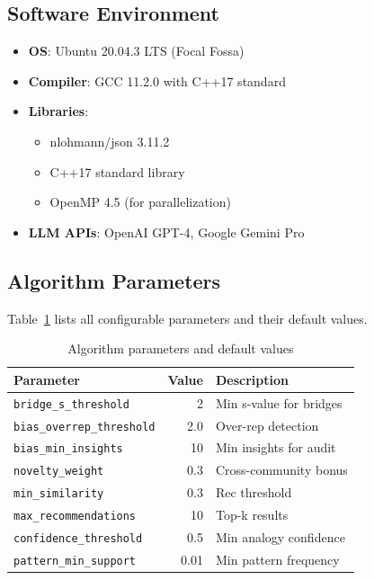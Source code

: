 \documentclass[11pt,twocolumn]{article}
\begin{document}
\subsection{Software Environment}

\begin{itemize}
\item \textbf{OS}: Ubuntu 20.04.3 LTS (Focal Fossa)
\item \textbf{Compiler}: GCC 11.2.0 with C++17 standard
\item \textbf{Libraries}:
  \begin{itemize}
  \item nlohmann/json 3.11.2
  \item C++17 standard library
  \item OpenMP 4.5 (for parallelization)
  \end{itemize}
\item \textbf{LLM APIs}: OpenAI GPT-4, Google Gemini Pro
\end{itemize}

\subsection{Algorithm Parameters}

Table~\ref{tab:parameters} lists all configurable parameters and their default values.

\begin{table}[h]
\centering
\caption{Algorithm parameters and default values}
\label{tab:parameters}
\begin{tabular}{lrl}
\toprule
\textbf{Parameter} & \textbf{Value} & \textbf{Description} \\
\midrule
\texttt{bridge\_s\_threshold} & 2 & Min s-value for bridges \\
\texttt{bias\_overrep\_threshold} & 2.0 & Over-rep detection \\
\texttt{bias\_min\_insights} & 10 & Min insights for audit \\
\texttt{novelty\_weight} & 0.3 & Cross-community bonus \\
\texttt{min\_similarity} & 0.3 & Rec threshold \\
\texttt{max\_recommendations} & 10 & Top-k results \\
\texttt{confidence\_threshold} & 0.5 & Min analogy confidence \\
\texttt{pattern\_min\_support} & 0.01 & Min pattern frequency \\
\bottomrule
\end{tabular}
\end{table}
\end{document}
